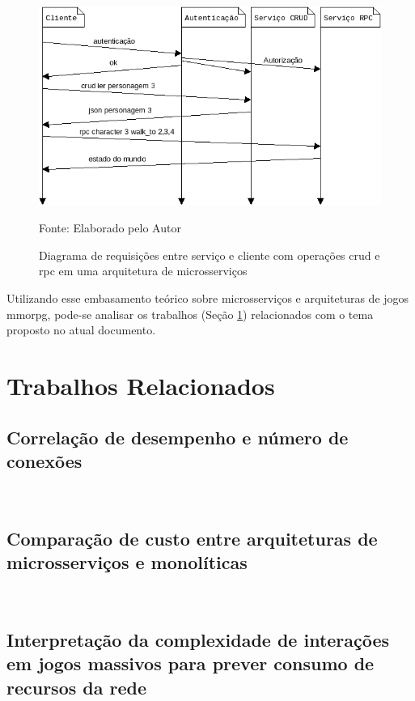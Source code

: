 \begin{figure}[htb!]
\caption{Diagrama de requisições entre serviço e cliente com operações \ac{crud} e \ac{rpc} em uma arquitetura de microsserviços}
\label{fig:network_crud_rpc_micro}
\includegraphics[height=6.5cm]{img/cap2/network_rpc_crud_micro.png}
\centering

Fonte: Elaborado pelo Autor
\end{figure}



Utilizando esse embasamento teórico sobre microsserviços e arquiteturas de jogos \ac{mmorpg}, pode-se analisar os trabalhos (Seção \ref{sec:similares}) relacionados com o tema proposto no atual documento.

\section{Trabalhos Relacionados}
\label{sec:similares}

\subsection{Correlação de desempenho e número de conexões}
~\cite{1417630}

\subsection{Comparação de custo entre arquiteturas de microsserviços e monolíticas}
~\cite{7515686}

\subsection{Interpretação da complexidade de interações em jogos massivos para prever consumo de recursos da rede}
~\cite{6374456}
